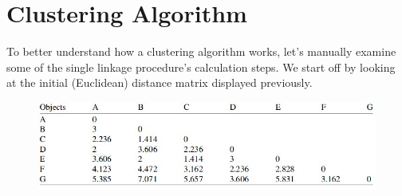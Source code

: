 \section{Clustering Algorithm}
To better understand how a clustering algorithm works, let’s manually examine
some of the single linkage procedure’s calculation steps. We start off by looking at
the initial (Euclidean) distance matrix displayed previously.

\begin{figure}[h!]
	\begin{center}
		\includegraphics[scale=0.6]{images/DistanceMatrix.jpg}\\
	\end{center}
\end{figure}

